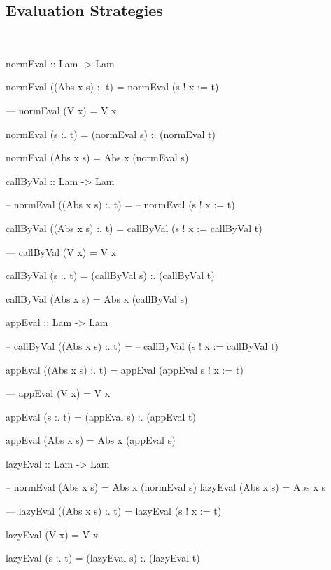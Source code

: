 \documentclass{beamer}
\begin{document}
\subsection{Evaluation Strategies}
\begin{frame}{\insertsectionhead\ \textemdash\
    \insertsubsectionhead}
\begin{code}
normEval :: Lam -> Lam

normEval ((Abs x s) :. t) =
  normEval (s ! x := t)

---
normEval (V x) = V x

normEval (s :. t) =
  (normEval s) :. (normEval t)

normEval (Abs x s) = Abs x (normEval s)
\end{code}

\framebreak

\begin{code}
callByVal :: Lam -> Lam

-- normEval ((Abs x s) :. t) =
--   normEval (s ! x := t)

callByVal ((Abs x s) :. t) =
  callByVal (s ! x := callByVal t)

---
callByVal (V x) = V x

callByVal (s :. t) =
  (callByVal s) :. (callByVal t)

callByVal (Abs x s) = Abs x (callByVal s)
\end{code}

\framebreak

\begin{code}
appEval :: Lam -> Lam

-- callByVal ((Abs x s) :. t) =
--   callByVal (s ! x := callByVal t)

appEval ((Abs x s) :. t) =
  appEval (appEval s ! x := t)

---
appEval (V x) = V x

appEval (s :. t) =
  (appEval s) :. (appEval t)

appEval (Abs x s) = Abs x (appEval s)
\end{code}

\framebreak

\begin{code}
lazyEval :: Lam -> Lam

-- normEval (Abs x s) = Abs x (normEval s)
lazyEval (Abs x s) = Abs x s

---
lazyEval ((Abs x s) :. t) =
  lazyEval (s ! x := t)

lazyEval (V x) = V x

lazyEval (s :. t) =
  (lazyEval s) :. (lazyEval t)
\end{code}

\end{frame}
\end{document}
